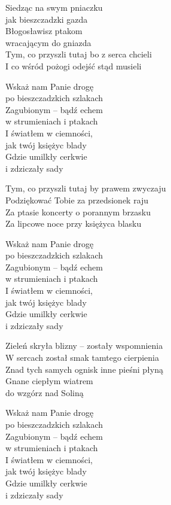 \begin{text}
\hfill\break
\hfill\break
Siedząc na swym pniaczku\\
jak bieszczadzki gazda\\
Błogosławisz ptakom\\
wracającym do gniazda\\
Tym, co przyszli tutaj bo z serca chcieli\\
I co wśród pożogi odejść stąd musieli

\vin Wskaż nam Panie drogę\\
\vin po bieszczadzkich szlakach\\
\vin Zagubionym – bądź echem\\
\vin w strumieniach i ptakach\\
\vin I światłem w ciemności,\\
\vin jak twój księżyc blady\\
\vin Gdzie umilkły cerkwie\\
\vin i zdziczały sady

Tym, co przyszli tutaj by prawem zwyczaju\\
Podziękować Tobie za przedsionek raju\\
Za ptasie koncerty o porannym brzasku\\
Za lipcowe noce przy księżyca blasku

\vin Wskaż nam Panie drogę\\
\vin po bieszczadzkich szlakach\\
\vin Zagubionym – bądź echem\\
\vin w strumieniach i ptakach\\
\vin I światłem w ciemności,\\
\vin jak twój księżyc blady\\
\vin Gdzie umilkły cerkwie\\
\vin i zdziczały sady

\hfill\break
Zieleń skryła blizny – zostały wspomnienia\\
W sercach został smak tamtego cierpienia\\
Znad tych samych ognisk inne pieśni płyną\\
Gnane ciepłym wiatrem\\
do wzgórz nad Soliną

\vin Wskaż nam Panie drogę\\
\vin po bieszczadzkich szlakach\\
\vin Zagubionym – bądź echem\\
\vin w strumieniach i ptakach\\
\vin I światłem w ciemności,\\
\vin jak twój księżyc blady\\
\vin Gdzie umilkły cerkwie\\
\vin i zdziczały sady
\end{text}
